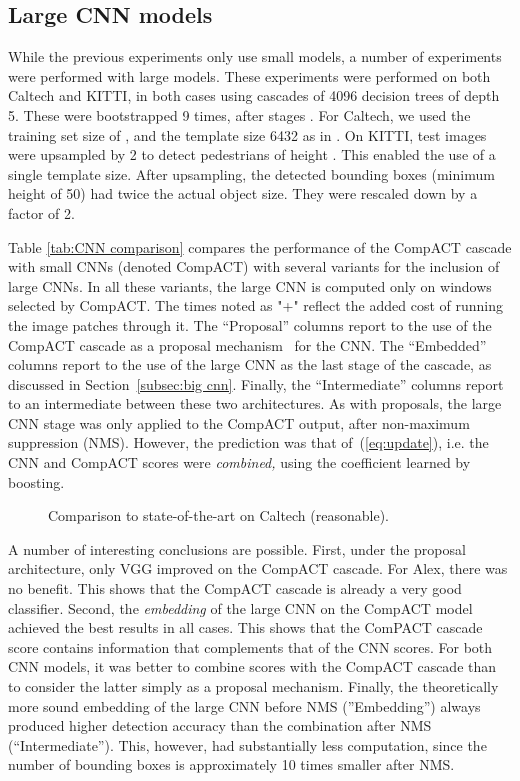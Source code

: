 \documentclass[10pt,twocolumn,letterpaper]{article}
\begin{document}
\subsection{Large CNN models}
\label{subsec:deepcacas}

While the previous experiments only use small models, a number of
experiments were performed with large models. These experiments
were performed on both Caltech and KITTI, in both cases
using cascades of 4096 decision trees of depth 5. These were bootstrapped
9 times, after stages . For Caltech, we used the training set size of \cite{DBLP:conf/nips/NamDH14}, and the template size 6432 as in \cite{DBLP:journals/pami/DollarABP14}. On KITTI, test images were upsampled by 2 to detect pedestrians of
height . This enabled the use of a single
template size. After upsampling, the detected bounding boxes
(minimum height of 50) had twice the actual object size. They were
rescaled down by a factor of 2.

Table \ref{tab:CNN comparison} compares the performance of the CompACT
cascade with small CNNs (denoted CompACT) with several variants for
the inclusion of large CNNs. In all these variants, the large CNN is
computed only on windows selected by CompACT. The times noted as "+"
reflect the added cost of running the image patches through it.
The ``Proposal'' columns report to the use of the CompACT cascade as a
proposal mechanism~\cite{DBLP:conf/cvpr/GirshickDDM14,
DBLP:journals/corr/HosangOBS15} for the CNN. The ``Embedded'' columns
report to the use of the large CNN as the last stage
of the cascade, as discussed in Section~\ref{subsec:big cnn}. Finally, the
``Intermediate'' columns report to an intermediate
between these two architectures. As with proposals,
the large CNN stage was only applied to the CompACT output, after
non-maximum suppression (NMS). However, the prediction was that
of~(\ref{eq:update}), i.e. the CNN and CompACT scores were {\it combined,\/}
 using the coefficient  learned by boosting.

\begin{figure}[!t]
\centering
\centerline{}
\caption{Comparison to state-of-the-art on Caltech (reasonable).}
\label{fig:caltech}
\end{figure}

A number of interesting conclusions are possible. First,
under the proposal architecture, only VGG improved on the
CompACT cascade. For Alex, there was no
benefit. This shows that the CompACT cascade is already a very good
classifier. Second, the {\it embedding\/} of the large CNN on the
CompACT model achieved the best results in all cases. This shows
that the ComPACT cascade score contains information that complements that
of the CNN scores. For both CNN models, it was better to combine scores
with the CompACT cascade than to consider the latter simply as a proposal
mechanism. Finally, the theoretically
more sound embedding of the large CNN before NMS (''Embedding'') always produced higher detection accuracy than the combination after NMS (``Intermediate'').
This, however, had substantially less computation, since the number of bounding
boxes is approximately 10 times smaller after NMS.
\end{document}
